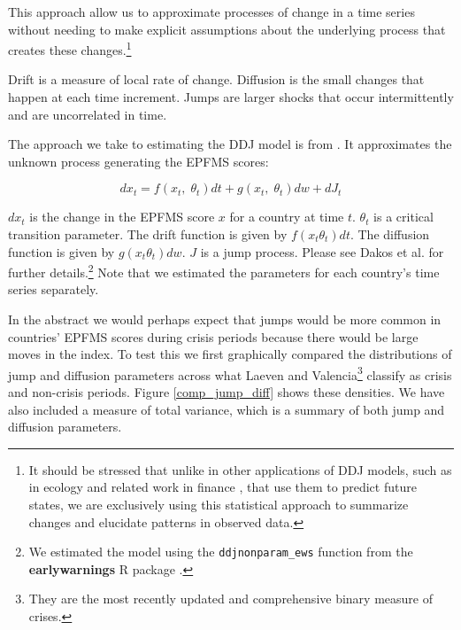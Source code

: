 \documentclass[]{article}
\begin{document}
This approach allow us to approximate processes of change in a time series without needing to make explicit assumptions about the underlying process that creates these changes.\footnote{It should be stressed that unlike in other applications of DDJ models, such as in ecology and related work in finance \citep{Kou2008}, that use them to predict future states, we are exclusively using this statistical approach to summarize changes and elucidate patterns in observed data.}

Drift is a measure of local rate of change. Diffusion is the small changes that happen at each time increment. Jumps are larger shocks that occur intermittently and are uncorrelated in time.

The approach we take to estimating the DDJ model is from \cite{Carpenter2011}. It approximates the unknown process generating the EPFMS scores:

\begin{equation}
      dx_{t} = f(x_{t},\;\theta_{t})dt + g(x_{t},\;\theta_{t})dw + dJ_{t}
\end{equation}

\noindent $dx_{t}$ is the change in the EPFMS score $x$ for a country at time $t$. $\theta_{t}$ is a critical transition parameter. The drift function is given by $f(x_{t}\theta_{t})dt$. The diffusion function is given by $g(x_{t}\theta_{t})dw$. $J$ is a jump process. Please see Dakos et al. \citeyearpar[7]{Dakos2012} for further details.\footnote{We estimated the model using the \texttt{ddjnonparam\_ews} function from the \textbf{earlywarnings} R package \citep{earlywarnings2013}.} Note that we estimated the parameters for each country's time series separately.

In the abstract we would perhaps expect that jumps would be more common in countries' EPFMS scores during crisis periods because there would be large moves in the index. To test this we first graphically compared the distributions of jump and diffusion parameters across what Laeven and Valencia\footnote{They are the most recently updated and comprehensive binary measure of crises.} classify as crisis and non-crisis periods. Figure \ref{comp_jump_diff} shows these densities. We have also included a measure of total variance, which is a summary of both jump and diffusion parameters.
\end{document}
